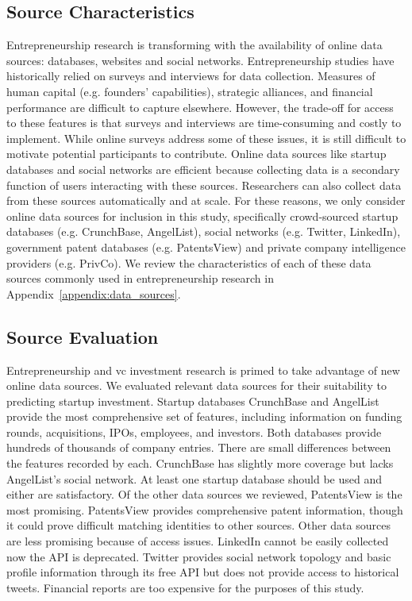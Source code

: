 \documentclass[../thesis/thesis.tex]{subfiles}
\begin{document}
\subsection{Source Characteristics}

Entrepreneurship research is transforming with the availability of online data sources: databases, websites and social networks. Entrepreneurship studies have historically relied on surveys and interviews for data collection. Measures of human capital (e.g. founders' capabilities), strategic alliances, and financial performance are difficult to capture elsewhere. However, the trade-off for access to these features is that surveys and interviews are time-consuming and costly to implement. While online surveys address some of these issues, it is still difficult to motivate potential participants to contribute. Online data sources like startup databases and social networks are efficient because collecting data is a secondary function of users interacting with these sources. Researchers can also collect data from these sources automatically and at scale. For these reasons, we only consider online data sources for inclusion in this study, specifically crowd-sourced startup databases (e.g. CrunchBase, AngelList), social networks (e.g. Twitter, LinkedIn), government patent databases (e.g. PatentsView) and private company intelligence providers (e.g. PrivCo). We review the characteristics of each of these data sources commonly used in entrepreneurship research in Appendix~\ref{appendix:data_sources}.

\subsection{Source Evaluation}

Entrepreneurship and \gls{vc} investment research is primed to take advantage of new online data sources. We evaluated relevant data sources for their suitability to predicting startup investment. Startup databases CrunchBase and AngelList provide the most comprehensive set of features, including information on funding rounds, acquisitions, IPOs, employees, and investors. Both databases provide hundreds of thousands of company entries. There are small differences between the features recorded by each. CrunchBase has slightly more coverage but lacks AngelList's social network. At least one startup database should be used and either are satisfactory. Of the other data sources we reviewed, PatentsView is the most promising. PatentsView provides comprehensive patent information, though it could prove difficult matching identities to other sources. Other data sources are less promising because of access issues. LinkedIn cannot be easily collected now the API is deprecated. Twitter provides social network topology and basic profile information through its free API but does not provide access to historical tweets. Financial reports are too expensive for the purposes of this study.
\end{document}
